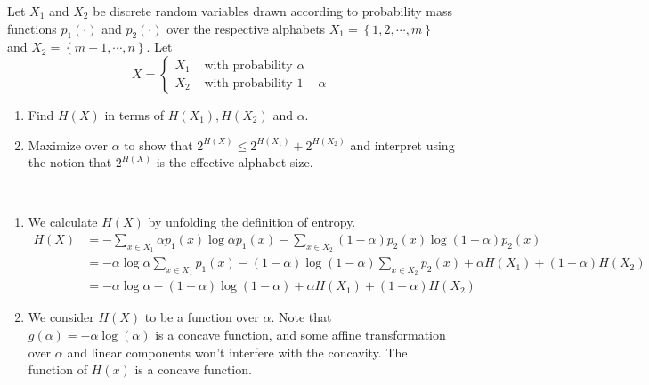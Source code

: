 \begin{exercise}{Let $X_1$ and $X_2$ be discrete random variables drawn according to probability mass functions $p_1(\cdot)$ and $p_2(\cdot)$ over the respective alphabets $X_1 = \left\{ 1, 2, \cdots , m \right\}$ and $X_2 = \left\{m + 1, \cdots , n\right\}$. Let
  \begin{equation}X=\left\{\begin{array}{ll}
    X_{1} & \text { with probability } \alpha \\
    X_{2} & \text { with probability } 1-\alpha
    \end{array}\right.\end{equation}
  \begin{enumerate}
    \item Find $H(X)$ in terms of $H(X_1), H(X_2)$ and $\alpha$.
    \item Maximize over $\alpha$ to show that $2^{H(X)} \le 2^{H(X_1)} + 2^{H(X_2)}$ and interpret using the notion that $2^{H(X)}$ is the effective alphabet
    size.
  \end{enumerate}
  }

  \begin{solution}
    \par{~}
    \begin{enumerate}
      \item {
        We calculate $H(X)$ by unfolding the definition of entropy.
        \begin{equation}
          \begin{aligned}
            H(X) &= - \sum_{x\in X_1} \alpha p_1 (x) \log \alpha p_1 (x) - \sum_{x\in X_2} (1-\alpha) p_2 (x) \log (1-\alpha) p_2 (x) \\
            &= - \alpha \log \alpha \sum_{x\in X_1} p_1 (x) - (1-\alpha) \log (1-\alpha) \sum_{x\in X_2} p_2 (x) + \alpha H(X_1) + (1-\alpha) H(X_2) \\
            &= - \alpha \log \alpha - (1-\alpha) \log (1-\alpha) + \alpha H(X_1) + (1-\alpha) H(X_2)
          \end{aligned}
        \end{equation}
      }
      \item {
        We consider $H(X)$ to be a function over $\alpha$. Note that $g(\alpha)= -\alpha\log(\alpha)$ is a concave function, and some affine transformation over $\alpha$ and linear components won't interfere with the concavity. The function of $H(x)$ is a concave function.

}
\end{enumerate}
\end{solution}
\end{exercise}
